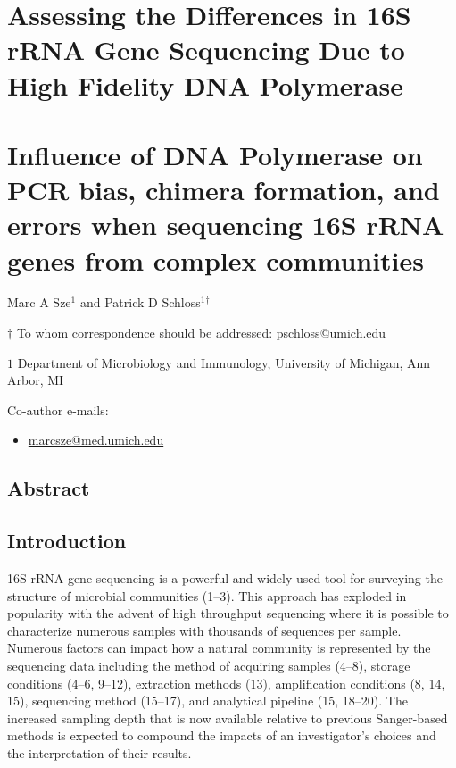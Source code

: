 \documentclass[11,]{article}
\title{}
\author{}
\date{}
\begin{document}
\section{Assessing the Differences in 16S rRNA Gene Sequencing Due to
High Fidelity DNA
Polymerase}\label{assessing-the-differences-in-16s-rrna-gene-sequencing-due-to-high-fidelity-dna-polymerase}

\section{Influence of DNA Polymerase on PCR bias, chimera formation, and
errors when sequencing 16S rRNA genes from complex
communities}\label{influence-of-dna-polymerase-on-pcr-bias-chimera-formation-and-errors-when-sequencing-16s-rrna-genes-from-complex-communities}

\begin{center}
\vspace{25mm}

Marc A Sze${^1}$ and Patrick D Schloss${^1}$${^\dagger}$

\vspace{20mm}

$\dagger$ To whom correspondence should be addressed: pschloss@umich.edu

$1$ Department of Microbiology and Immunology, University of Michigan, Ann Arbor, MI




\end{center}

Co-author e-mails:

\begin{itemize}
\itemsep1pt\parskip0pt
\item
  \href{mailto:marcsze@med.umich.edu}{marcsze@med.umich.edu}
\end{itemize}

\newpage
\linenumbers

\subsection{Abstract}\label{abstract}

\newpage

\subsection{Introduction}\label{introduction}

16S rRNA gene sequencing is a powerful and widely used tool for
surveying the structure of microbial communities (1--3). This approach
has exploded in popularity with the advent of high throughput sequencing
where it is possible to characterize numerous samples with thousands of
sequences per sample. Numerous factors can impact how a natural
community is represented by the sequencing data including the method of
acquiring samples (4--8), storage conditions (4--6, 9--12), extraction
methods (13), amplification conditions (8, 14, 15), sequencing method
(15--17), and analytical pipeline (15, 18--20). The increased sampling
depth that is now available relative to previous Sanger-based methods is
expected to compound the impacts of an investigator's choices and the
interpretation of their results.
\end{document}

